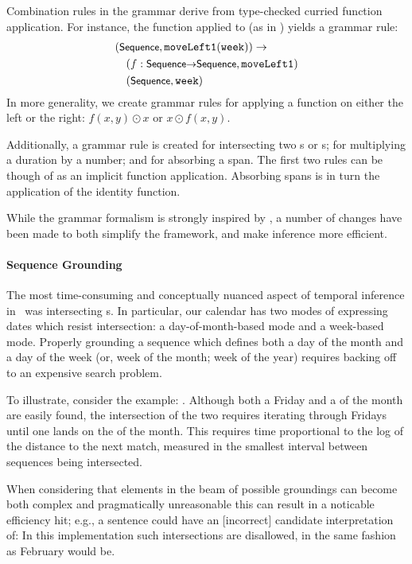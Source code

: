 Combination rules in the grammar derive from type-checked
  curried function application.
For instance, the function  applied
  to  (as in ) yields a grammar rule:
\begin{align*}
&  (\ty{Sequence}, \te{moveLeft1$($week$)$}) \rightarrow \\
&~~~(f:\ty{Sequence$\rightarrow$Sequence}, \te{moveLeft1}) \\
&~~~(\ty{Sequence}, \te{week})
\end{align*}
In more generality, we create grammar rules for applying a function
  on either the left or the right: $f(x,y) \odot x$ or $x \odot f(x,y)$.

Additionally, a grammar rule is created for intersecting two s or
  s; for multiplying a duration by a number; and for absorbing
  a  span.
The first two rules can be though of as an implicit function application.
Absorbing  spans is in turn the application of the identity function.

While the grammar formalism is strongly inspired by \me, a number of changes
  have been made to both simplify the framework, and make inference more
  efficient.

\paragraph{Sequence Grounding}
The most time-consuming and conceptually nuanced aspect of temporal inference
  in \me\ was intersecting s.
In particular, our calendar has two modes of expressing
  dates which resist intersection: a day-of-month-based mode and a
  week-based mode.
Properly grounding a sequence which defines both a day of the month and
  a day of the week (or, week of the month; week of the year) requires backing
  off to an expensive search problem.

To illustrate, consider the example: .
Although both a Friday and a  of the month are easily found, the
  intersection of the two requires iterating through Fridays until one lands
  on the  of the month.
This requires time proportional to the log of the distance to the next match,
  measured in the smallest interval between sequences being intersected.

When considering that elements in the beam of possible groundings can become
  both complex and pragmatically unreasonable this can result in a noticable
  efficiency hit; e.g., a sentence could have an
  [incorrect] candidate interpretation of:
In this implementation such intersections are disallowed, in the same fashion
  as February  would be.

